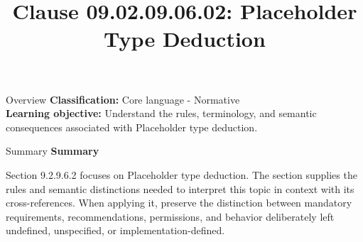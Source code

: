 \documentclass[10pt,letterpaper]{article}
\title{Clause 09.02.09.06.02: Placeholder Type Deduction}
\author{}
\date{}
\begin{document}
\maketitle
\begin{CornellOverviewBox}{Overview}
\textbf{Classification:} Core language - Normative\\[2pt]
\textbf{Learning objective:} Understand the rules, terminology, and semantic consequences associated with Placeholder type deduction.
\end{CornellOverviewBox}\begin{CornellSummaryBox}{Summary}
{\sffamily\bfseries\color{Accent} Summary}\par\vspace{3pt}Section 9.2.9.6.2 focuses on Placeholder type deduction. The section supplies the rules and semantic distinctions needed to interpret this topic in context with its cross-references. When applying it, preserve the distinction between mandatory requirements, recommendations, permissions, and behavior deliberately left undefined, unspecified, or implementation-defined.
\end{CornellSummaryBox}
\end{document}
